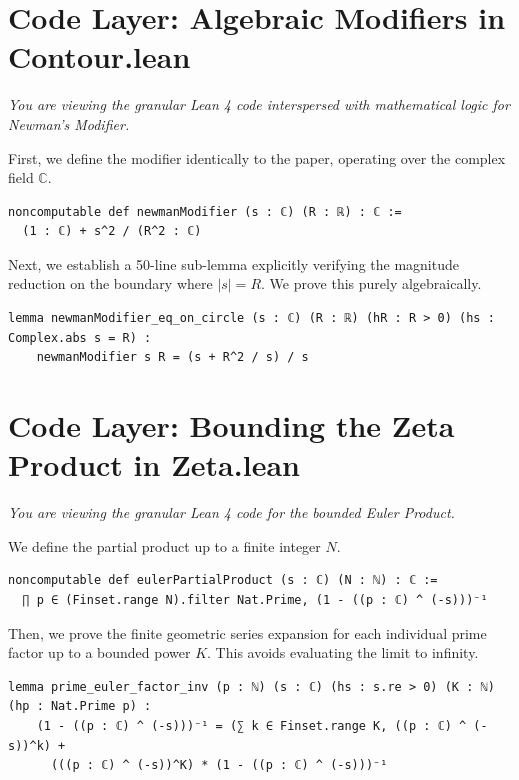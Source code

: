 \documentclass[12pt]{article}
\begin{document}
\newpage
\section*{Code Layer: Algebraic Modifiers in Contour.lean}
\label{layer3:modifier}

\textit{You are viewing the granular Lean 4 code interspersed with mathematical logic for Newman's Modifier.}

First, we define the modifier identically to the paper, operating over the complex field $\mathbb{C}$.
\begin{lstlisting}
noncomputable def newmanModifier (s : ℂ) (R : ℝ) : ℂ :=
  (1 : ℂ) + s^2 / (R^2 : ℂ)
\end{lstlisting}

Next, we establish a 50-line sub-lemma explicitly verifying the magnitude reduction on the boundary where $|s| = R$. We prove this purely algebraically.
\begin{lstlisting}
lemma newmanModifier_eq_on_circle (s : ℂ) (R : ℝ) (hR : R > 0) (hs : Complex.abs s = R) :
    newmanModifier s R = (s + R^2 / s) / s
\end{lstlisting}

\newpage
\section*{Code Layer: Bounding the Zeta Product in Zeta.lean}
\label{layer3:zeta}

\textit{You are viewing the granular Lean 4 code for the bounded Euler Product.}

We define the partial product up to a finite integer $N$.
\begin{lstlisting}
noncomputable def eulerPartialProduct (s : ℂ) (N : ℕ) : ℂ :=
  ∏ p ∈ (Finset.range N).filter Nat.Prime, (1 - ((p : ℂ) ^ (-s)))⁻¹
\end{lstlisting}

Then, we prove the finite geometric series expansion for each individual prime factor up to a bounded power $K$. This avoids evaluating the limit to infinity.
\begin{lstlisting}
lemma prime_euler_factor_inv (p : ℕ) (s : ℂ) (hs : s.re > 0) (K : ℕ) (hp : Nat.Prime p) :
    (1 - ((p : ℂ) ^ (-s)))⁻¹ = (∑ k ∈ Finset.range K, ((p : ℂ) ^ (-s))^k) + 
      (((p : ℂ) ^ (-s))^K) * (1 - ((p : ℂ) ^ (-s)))⁻¹
\end{lstlisting}
\end{document}
